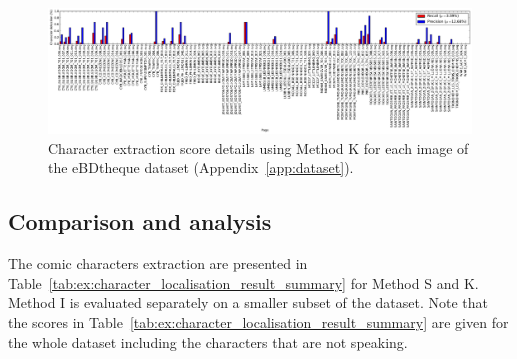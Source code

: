 \begin{figure}[h]
 \centering
  \label{fig:ex:character_method_C_auto_extraction_detail}
  \includegraphics[trim= 0mm 0mm 0mm 0mm, clip, width=\textwidth]{2014-09-04_cleaned_validated_from_method_B_for_panel_text_balloon_and_method_A_for_character_all_Character.pdf}
  
 \caption{Character extraction score details using Method K for each image of the eBDtheque dataset (Appendix~\ref{app:dataset}).
 }
 \label{fig:ex:character_methodC_extraction_detail}
\end{figure}



\subsection{Comparison and analysis} %
\label{sub:result_analysis}


The comic characters extraction are presented in Table~\ref{tab:ex:character_localisation_result_summary} for Method S and K.
Method I is evaluated separately on a smaller subset of the dataset.
Note that the scores in Table~\ref{tab:ex:character_localisation_result_summary} are given for the whole dataset including the characters that are not speaking.


